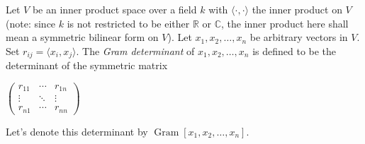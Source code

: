 \documentclass[12pt]{article}
\begin{document}
Let $V$ be an inner product space over a field $k$ with $\langle \cdot,\cdot\rangle$ the inner product on $V$ (note: since $k$ is not restricted to be either $\mathbb{R}$ or $\mathbb{C}$, the inner product here shall mean a symmetric bilinear form on $V$).  Let $x_1,x_2,\ldots,x_n$ be arbitrary vectors in $V$.  Set $r_{ij}=\langle x_i,x_j\rangle$.  The \emph{Gram determinant} of $x_1,x_2,\ldots,x_n$ is defined to be the determinant of the symmetric matrix

\begin{center}$
\begin{pmatrix}
r_{11} & \cdots & r_{1n} \\
\vdots & \ddots & \vdots \\
r_{n1} & \cdots & r_{nn}
\end{pmatrix}$
\end{center}

Let's denote this determinant by $\operatorname{Gram}[x_1,x_2,\ldots,x_n]$.
\end{document}

